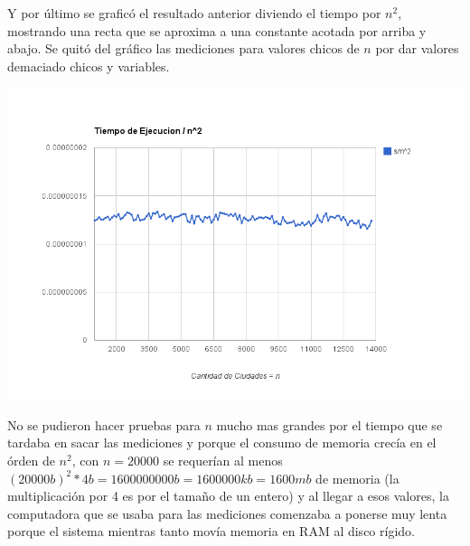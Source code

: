 Y por \'ultimo se grafic\'o el resultado anterior diviendo el tiempo por $n^2$, mostrando una recta que se aproxima a una constante acotada por arriba y abajo. Se quit\'o del gr\'afico las mediciones para valores chicos de $n$ por dar valores demaciado chicos y variables.
\begin{center}
	\includegraphics[scale=0.6]{images/ej2_d_n2.png}
\end{center}

No se pudieron hacer pruebas para $n$ mucho mas grandes por el tiempo que se tardaba en sacar las mediciones y porque el consumo de memoria crec\'ia en el \'orden de $n^2$, con $n = 20000$ se requer\'ian al menos $(20000b)^2 * 4b = 1600000000b = 1600000kb = 1600mb$ de memoria (la multiplicaci\'on por 4 es por el tama\~no de un entero) y al llegar a esos valores, la computadora que se usaba para las mediciones comenzaba a ponerse muy lenta porque el sistema mientras tanto mov\'ia memoria en RAM al disco r\'igido.
